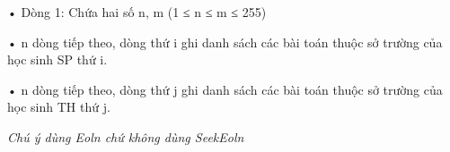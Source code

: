 • Dòng 1: Chứa hai số n, m (1 ≤ n ≤ m ≤ 255)   


   • n dòng tiếp theo, dòng thứ i ghi danh sách các bài toán thuộc sở trường của học sinh SP thứ i.   


   • n dòng tiếp theo, dòng thứ j ghi danh sách các bài toán thuộc sở trường của học sinh TH thứ j.   


\textit{    Chú ý dùng         Eoln        chứ không dùng         SeekEoln       }